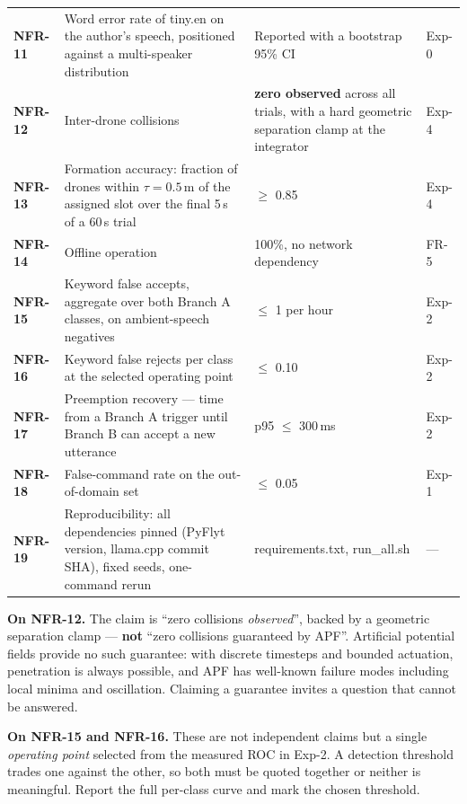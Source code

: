 \documentclass[11pt,a4paper]{article}
\newcommand{\code}[1]{{\ttfamily\small #1}}
\newcommand{\munit}[1]{\,#1}
\newenvironment{panel}
  {\par\begin{center}\begin{lrbox}{\panelbox}\begin{minipage}{0.94\textwidth}\vspace{3pt}}
  {\vspace{3pt}\end{minipage}\end{lrbox}%
   \fcolorbox{rulegray}{panelbg}{\usebox{\panelbox}}\end{center}\par}
\begin{document}
\begin{longtable}{@{}P{0.07}P{0.47}P{0.24}P{0.11}@{}}
\textbf{NFR-11}  & Word error rate of \code{tiny.en} on the author's speech, positioned against a
                   multi-speaker distribution & Reported with a bootstrap 95\% CI & Exp-0 \\
\textbf{NFR-12}  & Inter-drone collisions & \textbf{zero observed} across all trials, with a hard
                   geometric separation clamp at the integrator & Exp-4 \\
\textbf{NFR-13}  & Formation accuracy: fraction of drones within $\tau = 0.5$\munit{m} of the assigned
                   slot over the final 5\munit{s} of a 60\munit{s} trial & $\geq$ 0.85 & Exp-4 \\
\textbf{NFR-14}  & Offline operation & 100\%, no network dependency & FR-5 \\
\textbf{NFR-15}  & Keyword false accepts, aggregate over both Branch A classes, on ambient-speech
                   negatives & $\leq$ 1 per hour & Exp-2 \\
\textbf{NFR-16}  & Keyword false rejects per class at the selected operating point & $\leq$ 0.10 &
                   Exp-2 \\
\textbf{NFR-17}  & Preemption recovery --- time from a Branch A trigger until Branch B can accept a new
                   utterance & p95 $\leq$ 300\munit{ms} & Exp-2 \\
\textbf{NFR-18}  & False-command rate on the out-of-domain set & $\leq$ 0.05 & Exp-1 \\
\textbf{NFR-19}  & Reproducibility: all dependencies pinned (PyFlyt version, \code{llama.cpp} commit SHA),
                   fixed seeds, one-command rerun & \code{requirements.txt}, \code{run\_all.sh} & --- \\
\end{longtable}

\begin{panel}
\textbf{On NFR-12.} The claim is ``zero collisions \emph{observed}'', backed by a geometric separation
clamp --- \textbf{not} ``zero collisions guaranteed by APF''. Artificial potential fields provide no such
guarantee: with discrete timesteps and bounded actuation, penetration is always possible, and APF has
well-known failure modes including local minima and oscillation. Claiming a guarantee invites a question
that cannot be answered.

\textbf{On NFR-15 and NFR-16.} These are not independent claims but a single \emph{operating point}
selected from the measured ROC in Exp-2. A detection threshold trades one against the other, so both must
be quoted together or neither is meaningful. Report the full per-class curve and mark the chosen threshold.
\end{panel}
\end{document}
